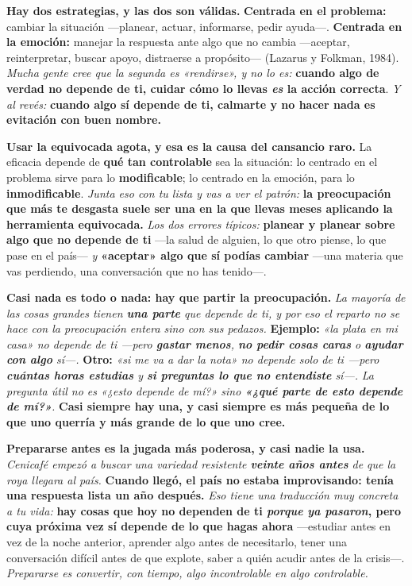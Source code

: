 \documentclass[11pt,letterpaper]{article}
\newcommand{\milcpaso}[3]{%
\Needspace{4\baselineskip}%
\begin{tcolorbox}[enhanced,colback=white,colframe=milcLinea,arc=1.5mm,boxrule=.9pt,
  left=14mm,right=4mm,top=3mm,bottom=3mm,before skip=4pt,after skip=4pt,
  fontupper=\RaggedRight,
  overlay={\node[anchor=north west,circle,fill=#2,text=white,inner sep=0pt,
    minimum size=7.4mm,font=\sffamily\bfseries\small]
    at ([xshift=3.6mm,yshift=-3.2mm]frame.north west) {#1};}]
#3
\end{tcolorbox}}
\begin{document}
\milcpaso{1}{milcTurquesa}{\textbf{Hay dos estrategias, y las dos son válidas.} \textbf{Centrada en el problema:} cambiar la situación ---planear, actuar, informarse, pedir ayuda---. \textbf{Centrada en la emoción:} manejar la respuesta ante algo que no cambia ---aceptar, reinterpretar, buscar apoyo, distraerse a propósito--- (Lazarus y Folkman, 1984). \emph{Mucha gente cree que la segunda es «rendirse», y no lo es:} \textbf{cuando algo de verdad no depende de ti, cuidar cómo lo llevas \emph{es} la acción correcta}. \emph{Y al revés:} \textbf{cuando algo sí depende de ti, calmarte y no hacer nada es evitación con buen nombre.}}
\milcpaso{2}{milcTurquesa}{\textbf{Usar la equivocada agota, y esa es la causa del cansancio raro.} La eficacia depende de \textbf{qué tan controlable} sea la situación: lo centrado en el problema sirve para lo \textbf{modificable}; lo centrado en la emoción, para lo \textbf{inmodificable}. \emph{Junta eso con tu lista y vas a ver el patrón:} \textbf{la preocupación que más te desgasta suele ser una en la que llevas meses aplicando la herramienta equivocada.} \emph{Los dos errores típicos:} \textbf{planear y planear sobre algo que no depende de ti} ---la salud de alguien, lo que otro piense, lo que pase en el país--- \emph{y} \textbf{«aceptar» algo que sí podías cambiar} ---una materia que vas perdiendo, una conversación que no has tenido---.}
\milcpaso{3}{milcTurquesa}{\textbf{Casi nada es todo o nada: hay que partir la preocupación.} \emph{La mayoría de las cosas grandes tienen \textbf{una parte} que depende de ti, y por eso el reparto no se hace con la preocupación entera sino con sus pedazos.} \textbf{Ejemplo:} \emph{«la plata en mi casa» no depende de ti ---pero \textbf{gastar menos}, \textbf{no pedir cosas caras} o \textbf{ayudar con algo} sí---.} \textbf{Otro:} \emph{«si me va a dar la nota» no depende solo de ti ---pero \textbf{cuántas horas estudias} y \textbf{si preguntas lo que no entendiste} sí---.} \emph{La pregunta útil no es «¿esto depende de mí?» sino \textbf{«¿qué parte de esto depende de mí?»}.} \textbf{Casi siempre hay una, y casi siempre es más pequeña de lo que uno querría y más grande de lo que uno cree.}}
\milcpaso{4}{milcTurquesa}{\textbf{Prepararse antes es la jugada más poderosa, y casi nadie la usa.} \emph{Cenicafé empezó a buscar una variedad resistente \textbf{veinte años antes} de que la roya llegara al país.} \textbf{Cuando llegó, el país no estaba improvisando: tenía una respuesta lista un año después.} \emph{Eso tiene una traducción muy concreta a tu vida:} \textbf{hay cosas que hoy no dependen de ti \emph{porque ya pasaron}, pero cuya próxima vez sí depende de lo que hagas ahora} ---estudiar antes en vez de la noche anterior, aprender algo antes de necesitarlo, tener una conversación difícil antes de que explote, saber a quién acudir antes de la crisis---. \emph{Prepararse es convertir, con tiempo, algo incontrolable en algo controlable.}}
\end{document}

